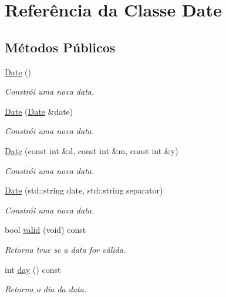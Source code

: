 \hypertarget{classDate}{}\section{Referência da Classe Date}
\label{classDate}
\subsection*{Métodos Públicos}
\begin{DoxyCompactItemize}
\item 
\mbox{\label{classDate_a4e59ed4ba66eec61c27460c5d09fa1bd}} 
\hyperlink{classDate_a4e59ed4ba66eec61c27460c5d09fa1bd}{Date} ()
\begin{DoxyCompactList}\small\item\em Constrói uma nova data. \end{DoxyCompactList}\item 
\hyperlink{classDate_ad041535fef212285db248a489b7fe4ae}{Date} (\hyperlink{classDate}{Date} \&date)
\begin{DoxyCompactList}\small\item\em Constrói uma nova data. \end{DoxyCompactList}\item 
\hyperlink{classDate_af1ef20ba3c9dbcdef09a916f12a8b435}{Date} (const int \&d, const int \&m, const int \&y)
\begin{DoxyCompactList}\small\item\em Constrói uma nova data. \end{DoxyCompactList}\item 
\hyperlink{classDate_adb32ff7d8a6ce35ad6fe0642b77853b4}{Date} (std\+::string date, std\+::string separator)
\begin{DoxyCompactList}\small\item\em Constrói uma nova data. \end{DoxyCompactList}\item 
bool \hyperlink{classDate_a03bd622b075b79a9c4e3a80552f8428e}{valid} (void) const
\begin{DoxyCompactList}\small\item\em Retorna true se a data for válida. \end{DoxyCompactList}\item 
int \hyperlink{classDate_a42aff770b2b450b6b2d83789b9194d56}{day} () const
\begin{DoxyCompactList}\small\item\em Retorna o dia da data. \end{DoxyCompactList}\item 

\end{DoxyCompactItemize}
